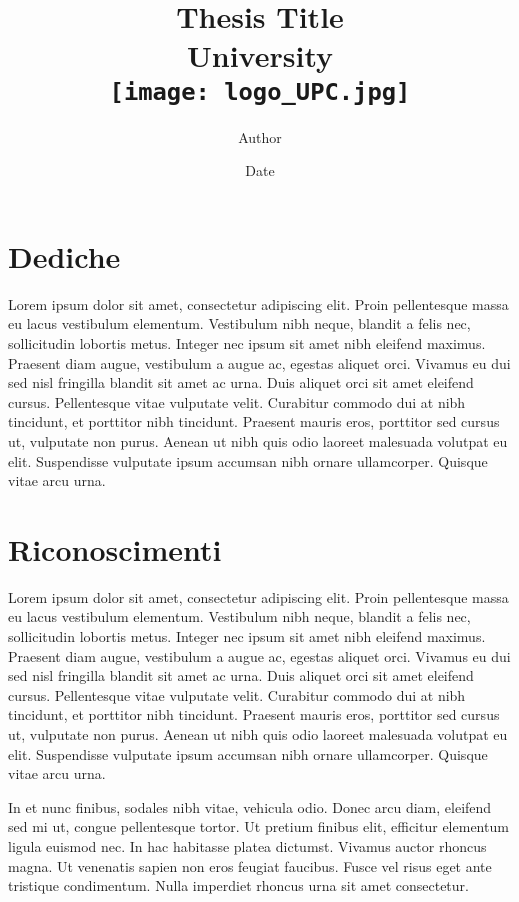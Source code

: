 \documentclass[12pt,twoside]{report}
\title{{Thesis Title}\\
	{\large University}\\
	{\label{img:logo_UPC}
	\texttt{[image: logo\_UPC.jpg]}}
}
\author{Author}
\date{Date}
\begin{document}

\clearpage\pagestyle{empty}\mbox{}\clearpage


\chapter*{Dediche}
Lorem ipsum dolor sit amet, consectetur adipiscing elit. Proin pellentesque massa eu lacus vestibulum elementum. Vestibulum nibh neque, blandit a felis nec, sollicitudin lobortis metus. Integer nec ipsum sit amet nibh eleifend maximus. Praesent diam augue, vestibulum a augue ac, egestas aliquet orci. Vivamus eu dui sed nisl fringilla blandit sit amet ac urna. Duis aliquet orci sit amet eleifend cursus. Pellentesque vitae vulputate velit. Curabitur commodo dui at nibh tincidunt, et porttitor nibh tincidunt. Praesent mauris eros, porttitor sed cursus ut, vulputate non purus. Aenean ut nibh quis odio laoreet malesuada volutpat eu elit. Suspendisse vulputate ipsum accumsan nibh ornare ullamcorper. Quisque vitae arcu urna.

\chapter*{Riconoscimenti}
Lorem ipsum dolor sit amet, consectetur adipiscing elit. Proin pellentesque massa eu lacus vestibulum elementum. Vestibulum nibh neque, blandit a felis nec, sollicitudin lobortis metus. Integer nec ipsum sit amet nibh eleifend maximus. Praesent diam augue, vestibulum a augue ac, egestas aliquet orci. Vivamus eu dui sed nisl fringilla blandit sit amet ac urna. Duis aliquet orci sit amet eleifend cursus. Pellentesque vitae vulputate velit. Curabitur commodo dui at nibh tincidunt, et porttitor nibh tincidunt. Praesent mauris eros, porttitor sed cursus ut, vulputate non purus. Aenean ut nibh quis odio laoreet malesuada volutpat eu elit. Suspendisse vulputate ipsum accumsan nibh ornare ullamcorper. Quisque vitae arcu urna.\par

In et nunc finibus, sodales nibh vitae, vehicula odio. Donec arcu diam, eleifend sed mi ut, congue pellentesque tortor. Ut pretium finibus elit, efficitur elementum ligula euismod nec. In hac habitasse platea dictumst. Vivamus auctor rhoncus magna. Ut venenatis sapien non eros feugiat faucibus. Fusce vel risus eget ante tristique condimentum. Nulla imperdiet rhoncus urna sit amet consectetur.\par
\end{document}
